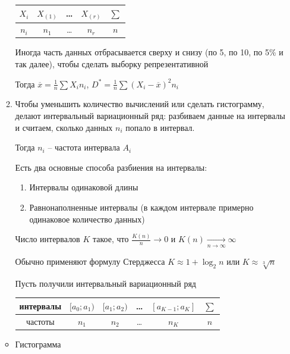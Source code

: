 \begin{enumerate}
\begin{enumerate}
        \begin{tabular}{c|c|c|c|c}
            $X_i$ & $X_{(1)}$ & \dots & $X_{(r)}$ & $\sum$ \\ 
            \hline
            $n_i$ & $n_1$ & \dots & $n_r$ & $n$ \\ 
        \end{tabular}

        Иногда часть данных отбрасывается сверху и снизу (по 5, по 10, по 5\% и так далее), чтобы сделать выборку репрезентативной

        Тогда $\overline{x} = \frac{1}{n} \sum X_i n_i$, $D^* = \frac{1}{n} \sum (X_i - \overline{x})^2 n_i$
        
        \item Чтобы уменьшить количество вычислений или сделать гистограмму, делают интервальный вариационный ряд: 
        разбиваем данные на интервалы и считаем, сколько данных $n_i$ попало в интервал. 

        Тогда $n_i$ -- частота интервала $A_i$

        Есть два основные способа разбиения на интервалы: 

        \begin{enumerate}
            \item Интервалы одинаковой длины
            \item Равнонаполненные интервалы (в каждом интервале примерно одинаковое количество данных)
        \end{enumerate}

        Число интервалов $K$ такое, что $\frac{K(n)}{n} \longrightarrow 0$ и $K(n) \underset{n \to \infty}{\longrightarrow} \infty$

        Обычно применяют формулу Стерджесса $K \approx 1 + \log_2 n$ или $K \approx \sqrt[3]{n}$

        Пусть получили интервальный вариационный ряд

        \begin{tabular}{c|c|c|c|c|c}
            интервалы & $[a_0; a_1)$ & $[a_1; a_2)$ & \dots & $[a_{K - 1}; a_K]$ & $\sum$ \\ 
            \hline
            частоты & $n_1$ & $n_2$ & \dots & $n_K$ & $n$ \\ 
        \end{tabular}
    \end{enumerate}

    \smallvspace
        
    \begin{multicols}{2}
        \begin{itemize}
            \item Гистограмма


\end{itemize}
\end{multicols}
\end{enumerate}
